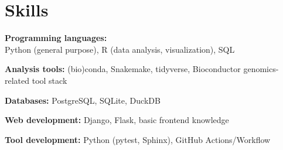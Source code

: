 \section{Skills}

\begin{entrylist}[itemsep=0.5ex]

\item \textbf{Programming languages:}\\
    Python (general purpose),
    R (data analysis, visualization),
    SQL

\item \textbf{Analysis tools:} (bio)conda, Snakemake, tidyverse, Bioconductor genomics-related tool stack

\item \textbf{Databases:} PostgreSQL, SQLite, DuckDB

\item \textbf{Web development:} Django, Flask, basic front\-end knowledge

\item \textbf{Tool development:} Python (pytest, Sphinx), GitHub Actions/Workflow

\end{entrylist}

